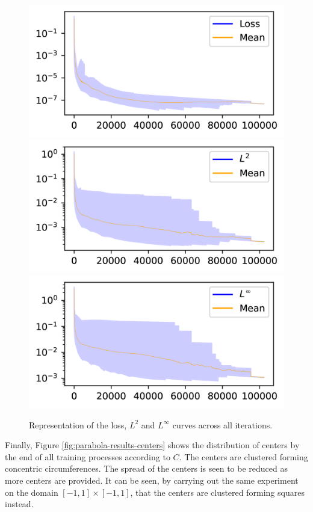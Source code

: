 \documentclass[12pt]{report} %
\begin{document}
\begin{figure}[h]
  \includegraphics[width=.7\textwidth]{imagenes/experiments/2d/statistical_2d_full_scheduler_interpolation/parabola/Loss_curves_semilogy_all.png}
  \includegraphics[width=.7\textwidth]{imagenes/experiments/2d/statistical_2d_full_scheduler_interpolation/parabola/L2_curves_semilogy_all.png}
  \includegraphics[width=.7\textwidth]{imagenes/experiments/2d/statistical_2d_full_scheduler_interpolation/parabola/Linf_curves_semilogy_all.png}
  \caption{Representation of the loss, $L^2$ and $L^\infty$ curves across all iterations.}
  \label{fig:parabola-results-last-iterations}
\end{figure}

Finally,
Figure \ref{fig:parabola-results-centers} shows the distribution of centers by the end of all training processes according to $C$. The centers are clustered forming concentric circumferences. The spread of the centers is seen to be reduced as more centers are provided. It can be seen, by carrying out the same experiment on the domain $[-1,1]\times[-1,1]$, that the centers are clustered forming squares instead.
\end{document}
